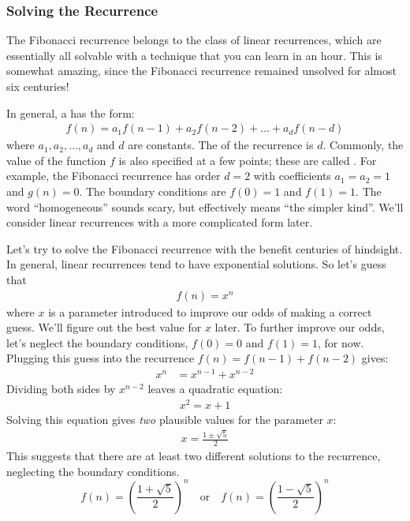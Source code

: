 \subsubsection{Solving the Recurrence}

The Fibonacci recurrence belongs to the class of linear recurrences,
which are essentially all solvable with a technique that you can learn
in an hour.  This is somewhat amazing, since the Fibonacci recurrence
remained unsolved for almost six centuries!

In general, a  has the form:
\begin{align*}
f(n) = a_1 f(n-1) + a_2 f(n-2) + \ldots + a_d f(n - d)
\end{align*}
where $a_1, a_2, \ldots, a_d$ and $d$ are constants. The 
of the recurrence is $d$.  Commonly, the value of the function $f$ is
also specified at a few points; these are called .  For example, the Fibonacci recurrence has order $d =
2$ with coefficients $a_1 = a_2 = 1$ and $g(n) = 0$.  The boundary
conditions are $f(0) = 1$ and $f(1) = 1$.  The word ``homogeneous''
sounds scary, but effectively means ``the simpler kind''.  We'll
consider linear recurrences with a more complicated form later.

Let's try to solve the Fibonacci recurrence with the benefit centuries
of hindsight.  In general, linear recurrences tend to have exponential
solutions.  So let's guess that
\begin{align*}
  f(n) = x^n
\end{align*}
where $x$ is a parameter introduced to improve our odds of making a
correct guess.  We'll figure out the best value for $x$ later. To
further improve our odds, let's neglect the boundary conditions, $f(0)
= 0$ and $f(1) = 1$, for now.  Plugging this guess into the recurrence
$f(n) = f(n - 1) + f(n - 2)$ gives:
\begin{align*}
x^n & = x^{n-1} + x^{n-2}
\end{align*}
Dividing both sides by $x^{n-2}$ leaves a quadratic equation:
\begin{align*}
x^2 = x + 1
\end{align*}
Solving this equation gives \emph{two} plausible values for the
parameter $x$:
\begin{align*}
x = \frac{1 \pm \sqrt{5}}{2}
\end{align*}
This suggests that there are at least two different solutions to the
recurrence, neglecting the boundary conditions.
\begin{equation*}
  f(n) = \left(\frac{1 + \sqrt{5}}{2}\right)^n\quad\text{or}\quad f(n) = \left(\frac{1 - \sqrt{5}}{2}\right)^n
\end{equation*}


